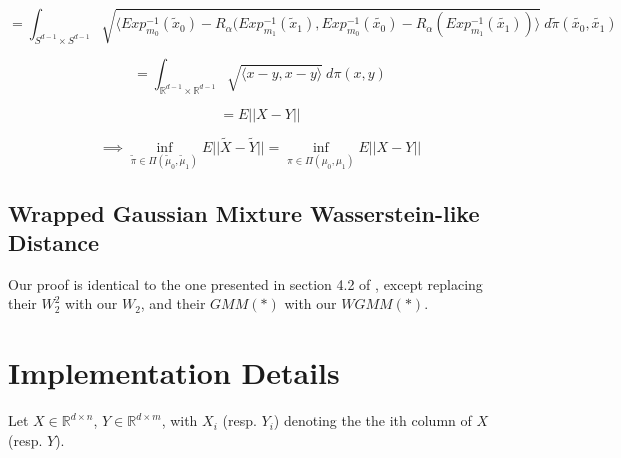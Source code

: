 \documentclass[]{article}
\begin{document}
\begin{equation*}
	= \int_{S^{d-1}\times S^{d-1}} \sqrt{\langle Exp_{m_0}^{-1}(\tilde{x}_0) - R_\alpha(Exp_{m_1}^{-1}(\tilde{x}_1), Exp_{m_0}^{-1}(\tilde{x_0}) - R_\alpha(Exp_{m_1}^{-1}(\tilde{x_1})) \rangle} \ d\tilde{\pi}(\tilde{x_0},\tilde{x_1})
\end{equation*}


\begin{equation*}
	= \int_{\mathbb{R}^{d-1} \times \mathbb{R}^{d-1}} \sqrt{ \langle x - y, x-y\rangle} \ d\pi(x,y)
\end{equation*}

\begin{equation*}
	= E||{X}-{Y}||  
\end{equation*}  

\begin{equation}
	\implies \inf_{\tilde{\pi} \in \Pi(\tilde{\mu}_0, \tilde{\mu}_1)} E||\tilde{X}-\tilde{Y}||  = \inf_{\pi \in \Pi({\mu}_0, {\mu}_1)} E||X-Y||
\end{equation}  

\subsection{Wrapped Gaussian Mixture Wasserstein-like Distance}

Our proof is identical to the one presented in section 4.2 of \cite{https://doi.org/10.48550/arxiv.1907.05254}, except replacing their $W_2^2$ with our $W_2$, and their $GMM(*)$ with our $WGMM(*)$. 




\newpage
\section{Implementation Details}

Let $X \in \mathbb{R}^{d \times n}$, $Y \in \mathbb{R}^{d \times m}$, with $X_i$ (resp. $Y_i$) denoting the the ith column of $X$ (resp. $Y$). 


\newpage


\cite{https://doi.org/10.48550/arxiv.1907.05254}
\cite{https://doi.org/10.48550/arxiv.0801.2250}
\cite{10.1307/mmj/1029003026}
\cite{COTFNT}
\end{document}
